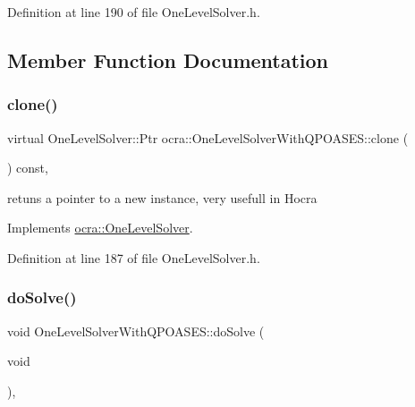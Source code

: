 Definition at line 190 of file One\+Level\+Solver.\+h.



\subsection{Member Function Documentation}
\hypertarget{classocra_1_1OneLevelSolverWithQPOASES_ac92f5e6885ada1f68b2f3b31cacf43f5}{}\label{classocra_1_1OneLevelSolverWithQPOASES_ac92f5e6885ada1f68b2f3b31cacf43f5} 
\subsubsection{\texorpdfstring{clone()}{clone()}}
{\footnotesize\ttfamily virtual One\+Level\+Solver\+::\+Ptr ocra\+::\+One\+Level\+Solver\+With\+Q\+P\+O\+A\+S\+E\+S\+::clone (\begin{DoxyParamCaption}{ }\end{DoxyParamCaption}) const\hspace{0.3cm}{\ttfamily [inline]}, {\ttfamily [virtual]}}

retuns a pointer to a new instance, very usefull in Hocra 

Implements \hyperlink{classocra_1_1OneLevelSolver_a08ecd92d4295e03aa03075a71d481f48}{ocra\+::\+One\+Level\+Solver}.



Definition at line 187 of file One\+Level\+Solver.\+h.

\hypertarget{classocra_1_1OneLevelSolverWithQPOASES_aa2d1343a6e0f5c8913496c3384c0cd40}{}\label{classocra_1_1OneLevelSolverWithQPOASES_aa2d1343a6e0f5c8913496c3384c0cd40} 
\subsubsection{\texorpdfstring{do\+Solve()}{doSolve()}}
{\footnotesize\ttfamily void One\+Level\+Solver\+With\+Q\+P\+O\+A\+S\+E\+S\+::do\+Solve (\begin{DoxyParamCaption}\item[{void}]{ }\end{DoxyParamCaption})\hspace{0.3cm}{\ttfamily [protected]}, {\ttfamily [virtual]}}



